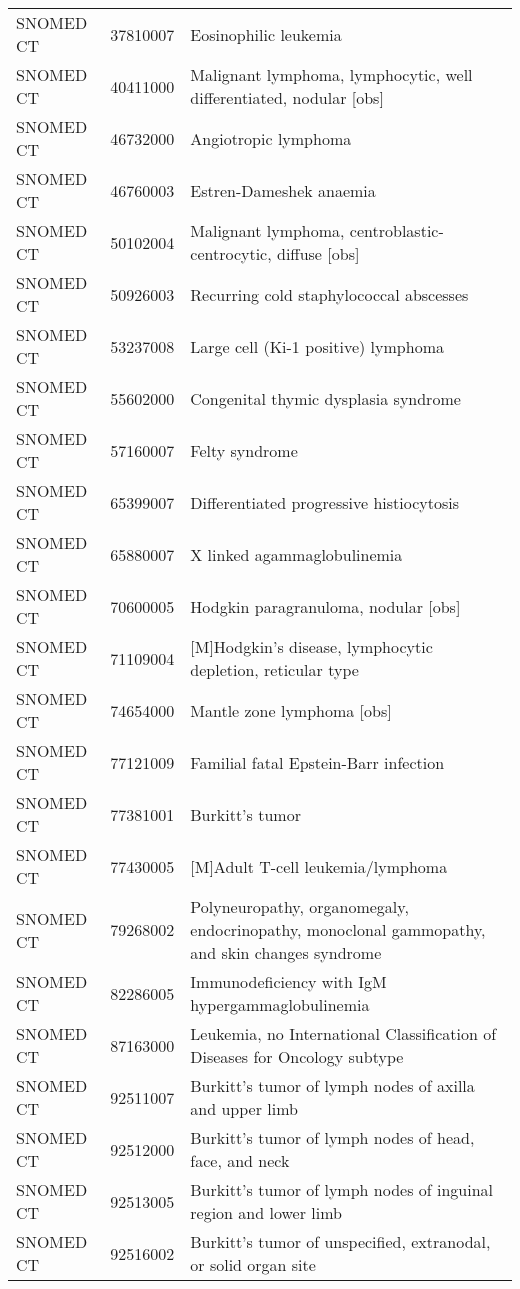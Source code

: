 \begin{table}[ht]
\begin{tabular}{lll}
  SNOMED CT & 37810007 & Eosinophilic leukemia \\ 
  SNOMED CT & 40411000 & Malignant lymphoma, lymphocytic, well differentiated, nodular [obs] \\ 
  SNOMED CT & 46732000 & Angiotropic lymphoma \\ 
  SNOMED CT & 46760003 & Estren-Dameshek anaemia \\ 
  SNOMED CT & 50102004 & Malignant lymphoma, centroblastic-centrocytic, diffuse [obs] \\ 
  SNOMED CT & 50926003 & Recurring cold staphylococcal abscesses \\ 
  SNOMED CT & 53237008 & Large cell (Ki-1 positive) lymphoma \\ 
  SNOMED CT & 55602000 & Congenital thymic dysplasia syndrome \\ 
  SNOMED CT & 57160007 & Felty syndrome \\ 
  SNOMED CT & 65399007 & Differentiated progressive histiocytosis \\ 
  SNOMED CT & 65880007 & X linked agammaglobulinemia \\ 
  SNOMED CT & 70600005 & Hodgkin paragranuloma, nodular [obs] \\ 
  SNOMED CT & 71109004 & [M]Hodgkin's disease, lymphocytic depletion, reticular type \\ 
  SNOMED CT & 74654000 & Mantle zone lymphoma [obs] \\ 
  SNOMED CT & 77121009 & Familial fatal Epstein-Barr infection \\ 
  SNOMED CT & 77381001 & Burkitt's tumor \\ 
  SNOMED CT & 77430005 & [M]Adult T-cell leukemia/lymphoma \\ 
  SNOMED CT & 79268002 & Polyneuropathy, organomegaly, endocrinopathy, monoclonal gammopathy, and skin changes syndrome \\ 
  SNOMED CT & 82286005 & Immunodeficiency with IgM hypergammaglobulinemia \\ 
  SNOMED CT & 87163000 & Leukemia, no International Classification of Diseases for Oncology subtype \\ 
  SNOMED CT & 92511007 & Burkitt's tumor of lymph nodes of axilla and upper limb \\ 
  SNOMED CT & 92512000 & Burkitt's tumor of lymph nodes of head, face, and neck \\ 
  SNOMED CT & 92513005 & Burkitt's tumor of lymph nodes of inguinal region and lower limb \\ 
  SNOMED CT & 92516002 & Burkitt's tumor of unspecified, extranodal, or solid organ site \\ 

\end{tabular}
\end{table}

